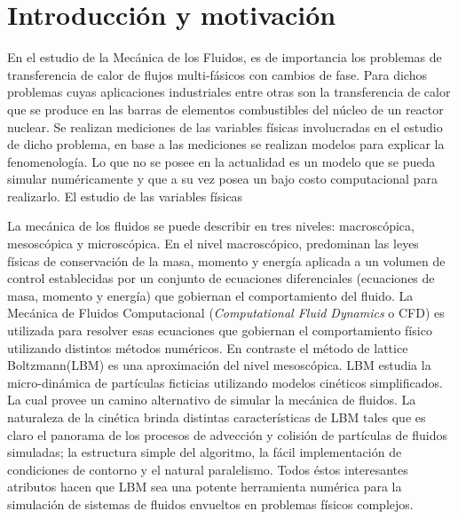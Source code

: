 \chapter{Introducci\'on y motivaci\'on}\label{cap1}

En el estudio de la Mecánica de los Fluidos, es de importancia los problemas de transferencia de calor de flujos multi-fásicos con cambios de fase. Para dichos problemas cuyas aplicaciones industriales entre otras son la transferencia de calor  que se produce en las barras de elementos combustibles del núcleo de un reactor nuclear. Se realizan mediciones de las variables físicas involucradas en el estudio de dicho problema, en base a las mediciones se realizan modelos para explicar la fenomenología. Lo que no se posee en la actualidad es un modelo que se pueda simular numéricamente y que a su vez posea un bajo costo computacional para realizarlo. El estudio de las variables físicas  

La mecánica de los fluidos se puede describir en tres niveles: macroscópica, mesoscópica y microscópica. En el nivel macroscópico, predominan las leyes físicas de conservación de la masa, momento y energía aplicada a un volumen de control establecidas por un conjunto de ecuaciones diferenciales (ecuaciones de masa, momento y energía) que gobiernan el comportamiento del fluido. La Mecánica de Fluidos Computacional (\textit{Computational Fluid Dynamics} o CFD) es utilizada para resolver esas ecuaciones que gobiernan el comportamiento físico utilizando distintos métodos numéricos. En contraste el método de lattice Boltzmann(LBM) es una aproximación del nivel mesoscópica. LBM estudia la micro-dinámica de partículas ficticias utilizando modelos cinéticos simplificados. La cual provee un camino alternativo de simular la mecánica de fluidos. La naturaleza de la cinética brinda distintas características de LBM tales que es claro el panorama de los procesos de advección y colisión de partículas de fluidos simuladas; la estructura simple del algoritmo, la fácil implementación de condiciones de contorno y el natural paralelismo. Todos éstos interesantes atributos hacen que LBM sea una potente herramienta numérica para la simulación de sistemas de fluidos envueltos en problemas físicos complejos.

